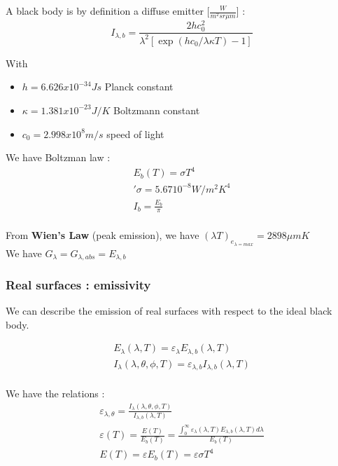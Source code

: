 \documentclass[../main.tex]{subfiles}
\begin{document}
A black body is by definition a diffuse emitter [$\frac{W}{m^2 sr \mu m}$] : \begin{equation}
    I_{\lambda,b} = \frac{2hc_0^2}{\lambda^2 [\exp(h c_0/\lambda \kappa T) - 1]}
\end{equation}

With \begin{itemize}
    \item $h = 6.626 x 10^{-34} Js$ Planck constant\\
    \item $\kappa = 1.381 x 10^{-23} J/K$ Boltzmann constant\\
    \item $c_0 = 2.998x 10^8 m/s$ speed of light\\
\end{itemize}

We have Boltzman law : \begin{equation}\begin{gathered}
    E_b(T) = \sigma T^4\\
 '   \sigma = 5.67 10^{-8} W/m^2K^4\\
    I_b = \frac{E_b}{\pi}\\
    \end{gathered}
\end{equation}

From \textbf{Wien's Law} (peak emission), we have $(\lambda T)_{e_{\lambda=max}} = 2898 \mu m K$\\

We have $G_\lambda = G_{\lambda, abs} = E_{\lambda, b}$\\

\subsubsection{Real surfaces : emissivity}
We can describe the emission of real surfaces with respect to the ideal black body.

\begin{equation}
    \begin{gathered}
        E_\lambda(\lambda, T) = \varepsilon_\lambda E_{\lambda, b}(\lambda, T)\\
        I_\lambda (\lambda, \theta, \phi, T) = \varepsilon_{\lambda, b} I_{\lambda, b} (\lambda, T)\\
    \end{gathered}
\end{equation}

We have the relations : \begin{equation}
    \begin{gathered}
        \varepsilon_{\lambda, \theta} = \frac{I_\lambda (\lambda, \theta, \phi, T)}{I_{\lambda, b}(\lambda, T)}\\
        \varepsilon(T) = \frac{E(T)}{E_b(T)} = \frac{\int_0^\infty \varepsilon_\lambda (\lambda, T) E_{\lambda,b}(\lambda, T)d\lambda}{E_b(T)}\\
        E(T) = \varepsilon E_b(T) = \varepsilon \sigma T^4\\
    \end{gathered}
\end{equation}
\end{document}
